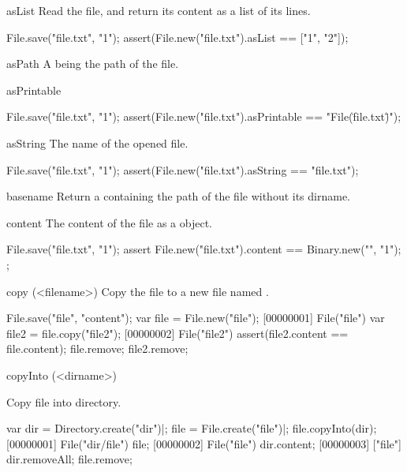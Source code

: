 \begin{urbiscriptapi}
\item[asList]
  Read the file, and return its content as a list of its lines.
\begin{urbiscript}
File.save("file.txt", "1\n");
assert(File.new("file.txt").asList == ["1", "2"]);
\end{urbiscript}


\item[asPath] A  being the path of the file.


\item[asPrintable]
\begin{urbiscript}
File.save("file.txt", "1\n");
assert(File.new("file.txt").asPrintable == "File(\"file.txt\")");
\end{urbiscript}


\item[asString]
  The name of the opened file.
\begin{urbiscript}
File.save("file.txt", "1\n");
assert(File.new("file.txt").asString == "file.txt");
\end{urbiscript}


\item[basename]
  Return a  containing the path of the file without
  its dirname.


\item[content]
  The content of the file as a  object.
\begin{urbiscript}
File.save("file.txt", "1\n");
assert
{
  File.new("file.txt").content == Binary.new("", "1\n");
};
\end{urbiscript}


\item[copy](<filename>)
  Copy the file to a new file named .
\begin{urbiscript}
File.save("file", "content");
var file = File.new("file");
[00000001] File("file")
var file2 = file.copy("file2");
[00000002] File("file2")
assert(file2.content == file.content);
file.remove;
file2.remove;
\end{urbiscript}


\item[copyInto](<dirname>)
  \experimental{}

  Copy file into  directory.
\begin{urbiscript}
var dir = Directory.create("dir")|;
file = File.create("file")|;
file.copyInto(dir);
[00000001] File("dir/file")
file;
[00000002] File("file")
dir.content;
[00000003] ["file"]
dir.removeAll;
file.remove;
\end{urbiscript}



\end{urbiscriptapi}
